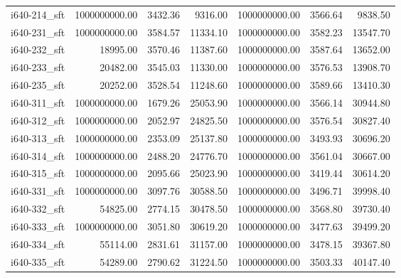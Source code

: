 \begin{tabular}{lrrrrrr}
i640-214\_sft &         1000000000.00 &                   3432.36 &             9316.00 &      1000000000.00 &                3566.64 &          9838.50 \\
i640-231\_sft &         1000000000.00 &                   3584.57 &            11334.10 &      1000000000.00 &                3582.23 &         13547.70 \\
i640-232\_sft &              18995.00 &                   3570.46 &            11387.60 &      1000000000.00 &                3587.64 &         13652.00 \\
i640-233\_sft &              20482.00 &                   3545.03 &            11330.00 &      1000000000.00 &                3576.53 &         13908.70 \\
i640-235\_sft &              20252.00 &                   3528.54 &            11248.60 &      1000000000.00 &                3589.66 &         13410.30 \\
i640-311\_sft &         1000000000.00 &                   1679.26 &            25053.90 &      1000000000.00 &                3566.14 &         30944.80 \\
i640-312\_sft &         1000000000.00 &                   2052.97 &            24825.50 &      1000000000.00 &                3576.54 &         30827.40 \\
i640-313\_sft &         1000000000.00 &                   2353.09 &            25137.80 &      1000000000.00 &                3493.93 &         30696.20 \\
i640-314\_sft &         1000000000.00 &                   2488.20 &            24776.70 &      1000000000.00 &                3561.04 &         30667.00 \\
i640-315\_sft &         1000000000.00 &                   2095.66 &            25023.90 &      1000000000.00 &                3419.44 &         30614.20 \\
i640-331\_sft &         1000000000.00 &                   3097.76 &            30588.50 &      1000000000.00 &                3496.71 &         39998.40 \\
i640-332\_sft &              54825.00 &                   2774.15 &            30478.50 &      1000000000.00 &                3568.80 &         39730.40 \\
i640-333\_sft &         1000000000.00 &                   3051.80 &            30619.20 &      1000000000.00 &                3477.63 &         39499.20 \\
i640-334\_sft &              55114.00 &                   2831.61 &            31157.00 &      1000000000.00 &                3478.15 &         39367.80 \\
i640-335\_sft &              54289.00 &                   2790.62 &            31224.50 &      1000000000.00 &                3503.33 &         40147.40 \\
\bottomrule
\end{tabular}
